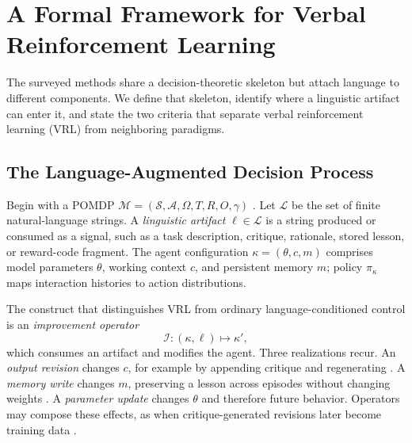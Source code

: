 \section{A Formal Framework for Verbal Reinforcement Learning}
\label{sec:framework}

The surveyed methods share a decision-theoretic skeleton but attach language to different components. We define that skeleton, identify where a linguistic artifact can enter it, and state the two criteria that separate verbal reinforcement learning (VRL) from neighboring paradigms.

\subsection{The Language-Augmented Decision Process}
\label{subsec:setting}

Begin with a POMDP $\mathcal{M}=(\mathcal{S},\mathcal{A},\Omega,T,R,O,\gamma)$ \citep{kaelbling1998planning,sutton2018reinforcement}. Let $\mathcal{L}$ be the set of finite natural-language strings. A \emph{linguistic artifact} $\ell\in\mathcal{L}$ is a string produced or consumed as a signal, such as a task description, critique, rationale, stored lesson, or reward-code fragment. The agent configuration $\kappa=(\theta,c,m)$ comprises model parameters $\theta$, working context $c$, and persistent memory $m$; policy $\pi_\kappa$ maps interaction histories to action distributions.

The construct that distinguishes VRL from ordinary language-conditioned control is an \emph{improvement operator}
\begin{equation}
\mathcal{I}:(\kappa,\ell)\longmapsto\kappa',
\label{eq:improvement}
\end{equation}
which consumes an artifact and modifies the agent. Three realizations recur. An \emph{output revision} changes $c$, for example by appending critique and regenerating \citep{madaan2023selfrefine}. A \emph{memory write} changes $m$, preserving a lesson across episodes without changing weights \citep{shinn2023reflexion,zhou2025memento}. A \emph{parameter update} changes $\theta$ and therefore future behavior. Operators may compose these effects, as when critique-generated revisions later become training data \citep{bai2022constitutional}.

